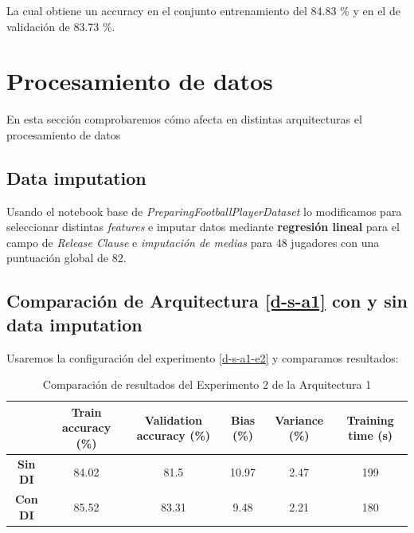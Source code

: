 \documentclass{article}
\begin{document}
La cual obtiene un accuracy en el conjunto entrenamiento del 84.83 \% y en el de validación de 83.73 \%.

	\section{Procesamiento de datos}
	\label{d-s-dp}
		En esta secci\'on comprobaremos c\'omo afecta en distintas arquitecturas el procesamiento de datos
		\subsection{Data imputation}
		\label{d-s-dp-di}
			Usando el notebook base de \textit{PreparingFootballPlayerDataset} lo modificamos para seleccionar distintas \textit{features} e imputar datos mediante \textbf{regresi\'on lineal} para el campo de \textit{Release Clause} e \textit{imputaci\'on de medias} para 48 jugadores con una puntuaci\'on global de 82.
			
		\subsection{Comparaci\'on de Arquitectura \ref{d-s-a1} con y sin data imputation}
		\label{d-s-dp-1}
			Usaremos la configuraci\'on del experimento \ref{d-s-a1-e2} y comparamos resultados:
			\begin{table}[!h]
				\begin{center}
					\begin{tabular}{ c | c | c | c | c | c |}
						\ & \textbf{Train accuracy (\%)} & \textbf{Validation accuracy (\%)} & \textbf{Bias (\%)} & \textbf{Variance (\%)} & \textbf{Training time (s)} \\ \hline
						\textbf{Sin DI} & 84.02 & 81.5 & 10.97 & 2.47 & 199\\ \hline
						\textbf{Con DI} & 85.52 & 83.31 & 9.48 & 2.21 & 180 \\ \hline
					\end{tabular}
					\caption{Comparaci\'on de resultados del Experimento 2 de la Arquitectura 1}
					\label{tab:res-d-a1-e2}
				\end{center}
			\end{table}
			
\end{document}
